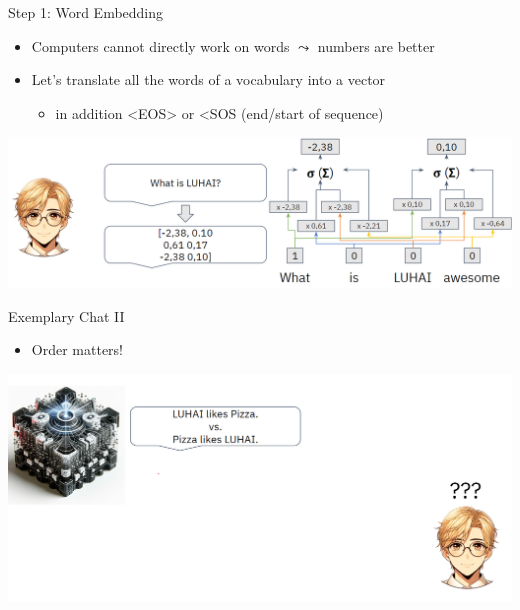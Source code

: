 \documentclass[aspectratio=169]{../latex_main/tntbeamer}  %
\begin{document}
        \begin{frame}{Step 1: Word Embedding}

            \begin{itemize}
                \item Computers cannot directly work on words $\leadsto$ numbers are better
                \item Let's translate all the words of a vocabulary into a vector
                \begin{itemize}
                    \item in addition <EOS> or <SOS (end/start of sequence)
                \end{itemize}
            \end{itemize}

            \centering
            \includegraphics[width=1\linewidth]{075_deep_learning/figures/transformer2.png}
        
        \end{frame}

        \begin{frame}{Exemplary Chat II}

            \begin{itemize}
                \item Order matters!
            \end{itemize}

            \centering
            \includegraphics[width=0.9\linewidth]{075_deep_learning/figures/transformer3.png}
        
        \end{frame}
\end{document}
